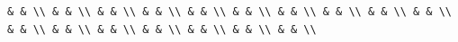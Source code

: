 \documentclass[
]{article}
\begin{document}
\begin{verbatim}
& & \\ & & \\ & & \\ & & \\ & & \\ & & \\ & & \\ & & \\ & & \\ & & \\ & & \\ & & \\ & & \\ & & \\ & & \\ & & \\ & & \\ 
\end{verbatim}
\end{document}
